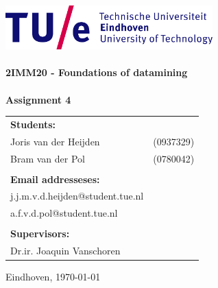 \begin{titlepage}

\begin{center}

\includegraphics[width=0.6\textwidth]{./Figures/TUe}~\\[2cm]



\HRule \\[0.4cm]
{ \huge \bfseries 2IMM20 - Foundations of datamining\\[0.3cm] }
\HRule \\[1.5cm]
\textbf{Assignment 4}



\vfill

\begin{table}[h]
\begin{tabular}{ll}
\textbf{Students:} & \\
Joris van der Heijden & (0937329)\\
Bram van der Pol & (0780042)\\

\\
\textbf{Email addresseses:} & \\
j.j.m.v.d.heijden@student.tue.nl \\
a.f.v.d.pol@student.tue.nl \\
\\
\textbf{Supervisors:} &\\
Dr.ir. Joaquin Vanschoren
\\

\end{tabular}
\end{table}



\large
{ Eindhoven, \today}

\end{center}


\end{titlepage}
